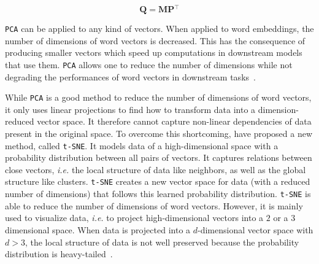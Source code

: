     \begin{equation}
      \mathbf{Q} = \mathbf{M} \mathbf{P}{}^\top
    \end{equation}

    \texttt{PCA} can be applied to any kind of vectors. When applied to word
    embeddings, the number of dimensions of word vectors is decreased. This has
    the consequence of producing smaller vectors which speed up computations in
    downstream models that use them. \texttt{PCA} allows one to reduce the
    number of dimensions while not degrading the performances of word vectors in
    downstream tasks~\citep{lebret2014pca}.\medskip

    While \texttt{PCA} is a good method to reduce the number of dimensions of
    word vectors, it only uses linear projections to find how to transform data
    into a dimension-reduced vector space. It therefore cannot capture
    non-linear dependencies of data present in the original space. To overcome
    this shortcoming, \citeauthor{maaten2008visualizing}
    \citep{maaten2008visualizing} have proposed a new method, called
    \texttt{t-SNE}. It models data of a high-dimensional space with a
    probability distribution between all pairs of vectors. It captures relations
    between close vectors, \textit{i.e.} the local structure of data like
    neighbors, as well as the global structure like clusters. \texttt{t-SNE}
    creates a new vector space for data (with a reduced number of dimensions)
    that follows this learned probability distribution. \texttt{t-SNE} is able
    to reduce the number of dimensions of word vectors. However, it is mainly
    used to visualize data, \textit{i.e.} to project high-dimensional vectors
    into a $2$ or a $3$ dimensional space. When data is projected into a
    $d$-dimensional vector space with $d > 3$, the local structure of data is
    not well preserved because the probability distribution is
    heavy-tailed~\citep{maaten2008visualizing}.\medskip

